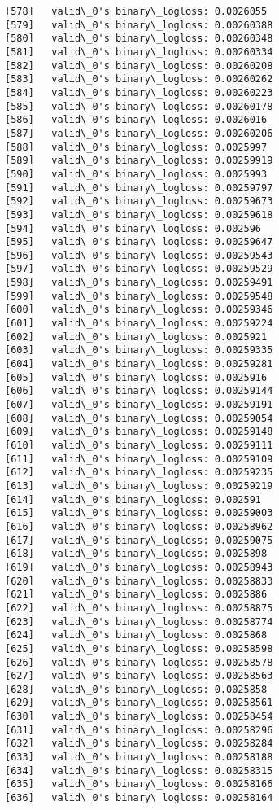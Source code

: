 \documentclass[11pt]{article}
\begin{document}
\begin{Verbatim}[commandchars=\\\{\}]
[578]	valid\_0's binary\_logloss: 0.0026055
[579]	valid\_0's binary\_logloss: 0.00260388
[580]	valid\_0's binary\_logloss: 0.00260348
[581]	valid\_0's binary\_logloss: 0.00260334
[582]	valid\_0's binary\_logloss: 0.00260208
[583]	valid\_0's binary\_logloss: 0.00260262
[584]	valid\_0's binary\_logloss: 0.00260223
[585]	valid\_0's binary\_logloss: 0.00260178
[586]	valid\_0's binary\_logloss: 0.0026016
[587]	valid\_0's binary\_logloss: 0.00260206
[588]	valid\_0's binary\_logloss: 0.0025997
[589]	valid\_0's binary\_logloss: 0.00259919
[590]	valid\_0's binary\_logloss: 0.0025993
[591]	valid\_0's binary\_logloss: 0.00259797
[592]	valid\_0's binary\_logloss: 0.00259673
[593]	valid\_0's binary\_logloss: 0.00259618
[594]	valid\_0's binary\_logloss: 0.002596
[595]	valid\_0's binary\_logloss: 0.00259647
[596]	valid\_0's binary\_logloss: 0.00259543
[597]	valid\_0's binary\_logloss: 0.00259529
[598]	valid\_0's binary\_logloss: 0.00259491
[599]	valid\_0's binary\_logloss: 0.00259548
[600]	valid\_0's binary\_logloss: 0.00259346
[601]	valid\_0's binary\_logloss: 0.00259224
[602]	valid\_0's binary\_logloss: 0.0025921
[603]	valid\_0's binary\_logloss: 0.00259335
[604]	valid\_0's binary\_logloss: 0.00259281
[605]	valid\_0's binary\_logloss: 0.0025916
[606]	valid\_0's binary\_logloss: 0.00259144
[607]	valid\_0's binary\_logloss: 0.00259191
[608]	valid\_0's binary\_logloss: 0.00259054
[609]	valid\_0's binary\_logloss: 0.00259148
[610]	valid\_0's binary\_logloss: 0.00259111
[611]	valid\_0's binary\_logloss: 0.00259109
[612]	valid\_0's binary\_logloss: 0.00259235
[613]	valid\_0's binary\_logloss: 0.00259219
[614]	valid\_0's binary\_logloss: 0.002591
[615]	valid\_0's binary\_logloss: 0.00259003
[616]	valid\_0's binary\_logloss: 0.00258962
[617]	valid\_0's binary\_logloss: 0.00259075
[618]	valid\_0's binary\_logloss: 0.0025898
[619]	valid\_0's binary\_logloss: 0.00258943
[620]	valid\_0's binary\_logloss: 0.00258833
[621]	valid\_0's binary\_logloss: 0.0025886
[622]	valid\_0's binary\_logloss: 0.00258875
[623]	valid\_0's binary\_logloss: 0.00258774
[624]	valid\_0's binary\_logloss: 0.0025868
[625]	valid\_0's binary\_logloss: 0.00258598
[626]	valid\_0's binary\_logloss: 0.00258578
[627]	valid\_0's binary\_logloss: 0.00258563
[628]	valid\_0's binary\_logloss: 0.0025858
[629]	valid\_0's binary\_logloss: 0.00258561
[630]	valid\_0's binary\_logloss: 0.00258454
[631]	valid\_0's binary\_logloss: 0.00258296
[632]	valid\_0's binary\_logloss: 0.00258284
[633]	valid\_0's binary\_logloss: 0.00258188
[634]	valid\_0's binary\_logloss: 0.00258315
[635]	valid\_0's binary\_logloss: 0.00258166
[636]	valid\_0's binary\_logloss: 0.00258164

\end{Verbatim}
\end{document}
